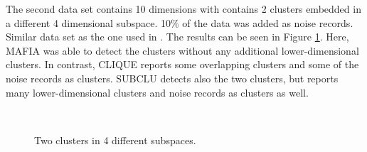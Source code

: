The second data set contains 10 dimensions with contains 2 clusters embedded in a different 4 dimensional subspace. 10\% of the data was added as noise records. Similar data set as the one used in \cite{mafia}. The results can be seen in Figure \ref{fig:accuracy_2clusters}. Here, MAFIA was able to detect the clusters without any additional lower-dimensional clusters. In contrast, CLIQUE reports some overlapping clusters and some of the noise records as clusters. SUBCLU detects also the two clusters, but reports many lower-dimensional clusters and noise records as clusters as well.
\begin{figure}[H]
    \vspace*{-0.5cm}
    \centering
    ~~~~
    ~~~~
    \caption{Two clusters in 4 different subspaces.}
    \label{fig:accuracy_2clusters}
    \vspace*{-0.5cm}
\end{figure}

